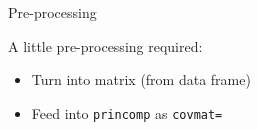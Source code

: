 \documentclass[ignorenonframetext,]{beamer}
\newenvironment{Shaded}{\begin{snugshade}}{\end{snugshade}}
\newcommand{\DataTypeTok}[1]{\textcolor[rgb]{0.13,0.29,0.53}{#1}}
\newcommand{\KeywordTok}[1]{\textcolor[rgb]{0.13,0.29,0.53}{\textbf{#1}}}
\newcommand{\NormalTok}[1]{#1}
\newcommand{\OperatorTok}[1]{\textcolor[rgb]{0.81,0.36,0.00}{\textbf{#1}}}
\newcommand{\StringTok}[1]{\textcolor[rgb]{0.31,0.60,0.02}{#1}}
\begin{document}
\begin{frame}[fragile]{Pre-processing}
\protect\hypertarget{pre-processing}{}

A little pre-processing required:

\begin{itemize}
\item
  Turn into matrix (from data frame)
\item
  Feed into \texttt{princomp} as \texttt{covmat=}
\end{itemize}

\begin{Shaded}
\end{Shaded}

\end{frame}
\end{document}
